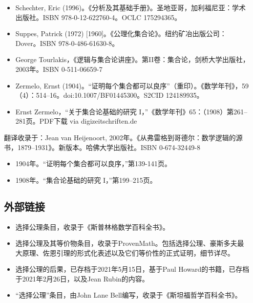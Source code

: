 \begin{itemize}
\item Schechter, Eric (1996)。《分析及其基础手册》。圣地亚哥，加利福尼亚：学术出版社。ISBN 978-0-12-622760-4。OCLC 175294365。  
\item Suppes, Patrick (1972) [1960]。《公理化集合论》。纽约矿冶出版公司：Dover。ISBN 978-0-486-61630-8。  
\item George Tourlakis，《逻辑与集合论讲座》。第II卷：集合论，剑桥大学出版社，2003年。ISBN 0-511-06659-7  
\item Zermelo, Ernst (1904)。“证明每个集合都可以良序”（重印）。《数学年刊》，59（4）：514–16。doi:10.1007/BF01445300。S2CID 124189935。
\item Ernst Zermelo，“关于集合论基础的研究 I，”《数学年刊》65：（1908）第261–281页。PDF下载 via digizeitschriften.de 
\end{itemize}
翻译收录于：Jean van Heijenoort, 2002年。《从弗雷格到哥德尔：数学逻辑的源书，1879–1931》。新版本。哈佛大学出版社。ISBN 0-674-32449-8  
\begin{itemize}
\item 1904年。“证明每个集合都可以良序，”第139-141页。  
\item 1908年。“集合论基础的研究 I，”第199–215页。
\end{itemize}
\subsection{外部链接}
\begin{itemize}
\item 选择公理条目，收录于《斯普林格数学百科全书》。  
\item 选择公理及其等价物条目，收录于ProvenMath。包括选择公理、豪斯多夫最大原理、佐恩引理的形式化表述以及它们等价性的正式证明，细节详尽。  
\item 选择公理的后果，已存档于2021年5月15日，基于Paul Howard的书籍，已存档于2021年2月26日，以及Jean Rubin的内容。  
\item “选择公理”条目，由John Lane Bell编写，收录于《斯坦福哲学百科全书》。
\end{itemize}